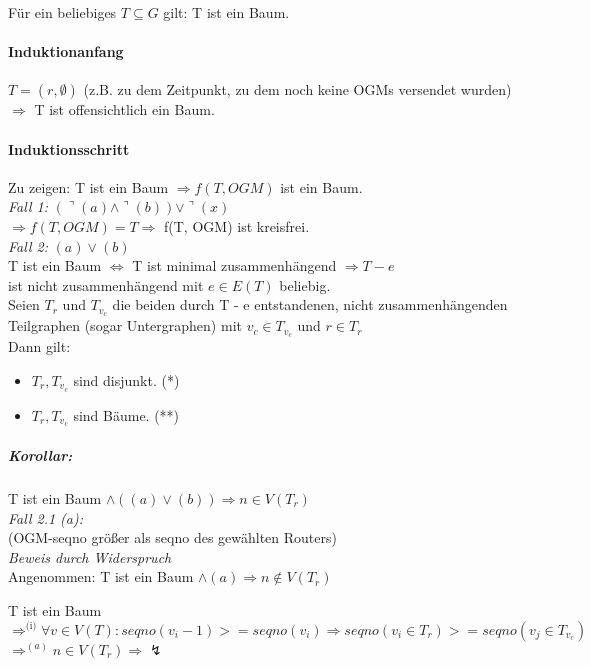 \documentclass[a4paper,10pt]{scrartcl}[2003/01/01] %
\begin{document}
Für ein beliebiges $T \subseteq G$ gilt: T ist ein Baum.

\paragraph{Induktionanfang}

$T = ({r}, \emptyset)$ (z.B. zu dem Zeitpunkt, zu dem noch keine OGMs versendet wurden)
$\Rightarrow$ T ist offensichtlich ein Baum.

\paragraph{Induktionsschritt}

Zu zeigen: T ist ein Baum $\Rightarrow f(T, OGM)$ ist ein Baum. \\

\emph{Fall 1:} $(\urcorner(a) \wedge \urcorner(b)) \vee \urcorner(x)$ \\
$\Rightarrow f(T, OGM) = T \Rightarrow$ f(T, OGM) ist kreisfrei. \\

\emph{Fall 2:} $(a) \vee (b)$ \\

T ist ein Baum $\Leftrightarrow$ T ist minimal zusammenhängend $\Rightarrow T - e$ \\
ist nicht zusammenhängend mit $e \in E(T)$ beliebig. \\

Seien $T_r$ und $T_{v_c}$ die beiden durch T - e entstandenen, nicht zusammenhängenden
Teilgraphen (sogar Untergraphen) mit $v_c \in T_{v_c}$ und $r \in T_r$ \\
Dann gilt:
\begin{itemize}
\item $T_r, T_{v_c}$ sind disjunkt. (*)
\item $T_r, T_{v_c}$ sind Bäume. (**)
\end{itemize}

\subparagraph{Korollar:} T ist ein Baum $\wedge ((a) \vee (b)) \Rightarrow n \in V(T_r)$ \\

\emph{Fall 2.1 (a):} \\
(OGM-seqno größer als seqno des gewählten Routers) \\
\emph{Beweis durch Widerspruch} \\
Angenommen: T ist ein Baum $\wedge (a) \Rightarrow n \notin V(T_r)$

T ist ein Baum $\Rightarrow^\text{(i)} \forall v \in V(T) : seqno(v_i - 1) >= seqno(v_{i}) \Rightarrow seqno(v_i \in T_r) >= seqno (v_j \in T_{v_c})$ \\
$\Rightarrow^{(a)} n \in V(T_r) \Rightarrow \lightning$ \\
\end{document}
